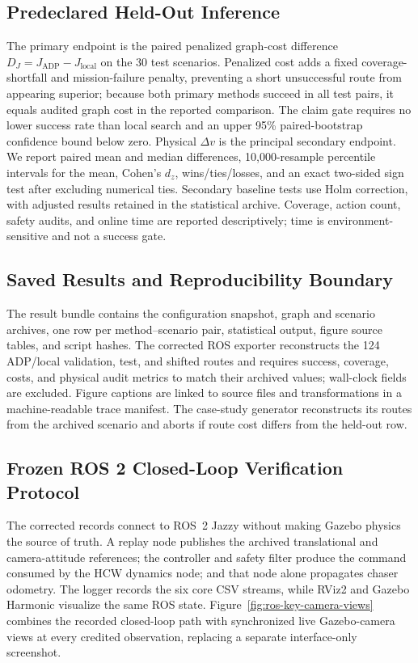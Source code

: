 \documentclass{IEEEtaes}
\theoremstyle{remark}
\theoremstyle{plain}
\begin{document}
\subsection{Predeclared Held-Out Inference}

The primary endpoint is the paired penalized graph-cost difference $D_J=J_{\mathrm{ADP}}-J_{\mathrm{local}}$ on the 30 test scenarios. Penalized cost adds a fixed coverage-shortfall and mission-failure penalty, preventing a short unsuccessful route from appearing superior; because both primary methods succeed in all test pairs, it equals audited graph cost in the reported comparison. The claim gate requires no lower success rate than local search and an upper 95\% paired-bootstrap confidence bound below zero. Physical $\Delta v$ is the principal secondary endpoint. We report paired mean and median differences, 10,000-resample percentile intervals for the mean, Cohen's $d_z$, wins/ties/losses, and an exact two-sided sign test after excluding numerical ties. Secondary baseline tests use Holm correction, with adjusted results retained in the statistical archive. Coverage, action count, safety audits, and online time are reported descriptively; time is environment-sensitive and not a success gate.

\subsection{Saved Results and Reproducibility Boundary}

The result bundle contains the configuration snapshot, graph and scenario archives, one row per method--scenario pair, statistical output, figure source tables, and script hashes. The corrected ROS exporter reconstructs the 124 ADP/local validation, test, and shifted routes and requires success, coverage, costs, and physical audit metrics to match their archived values; wall-clock fields are excluded. Figure captions are linked to source files and transformations in a machine-readable trace manifest. The case-study generator reconstructs its routes from the archived scenario and aborts if route cost differs from the held-out row.

\subsection{Frozen ROS 2 Closed-Loop Verification Protocol}
\label{sec:ros-verification-protocol}

The corrected records connect to ROS~2 Jazzy without making Gazebo physics the source of truth. A replay node publishes the archived translational and camera-attitude references; the controller and safety filter produce the command consumed by the HCW dynamics node; and that node alone propagates chaser odometry. The logger records the six core CSV streams, while RViz2 and Gazebo Harmonic visualize the same ROS state. Figure~\ref{fig:ros-key-camera-views} combines the recorded closed-loop path with synchronized live Gazebo-camera views at every credited observation, replacing a separate interface-only screenshot.
\end{document}
